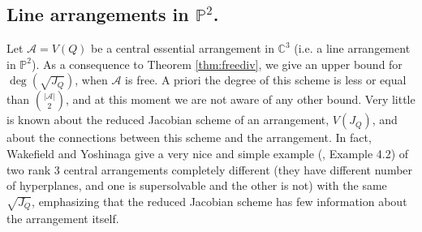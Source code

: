 \documentclass[12pt]{amsart}
\begin{document}
\subsection{Line arrangements in $\mathbb P^2$.} Let $\mathcal A=V(Q)$ be a central essential arrangement in $\mathbb C^3$ (i.e. a line arrangement in $\mathbb P^2$). As a consequence to Theorem \ref{thm:freediv}, we give an upper bound for $\deg(\sqrt{J_Q})$, when $\mathcal A$ is free. A priori the degree of this scheme is less or equal than ${{|\mathcal A|}\choose{2}}$, and at this moment we are not aware of any other bound. Very little is known about the reduced Jacobian scheme of an arrangement, $V(J_Q)$, and about the connections between this scheme and the arrangement. In fact, Wakefield and Yoshinaga give a very nice and simple example (\cite{wy}, Example 4.2) of two rank 3 central arrangements completely different (they have different number of hyperplanes, and one is supersolvable and the other is not) with the same $\sqrt{J_Q}$, emphasizing that the reduced Jacobian scheme has few information about the arrangement itself.
\end{document}
